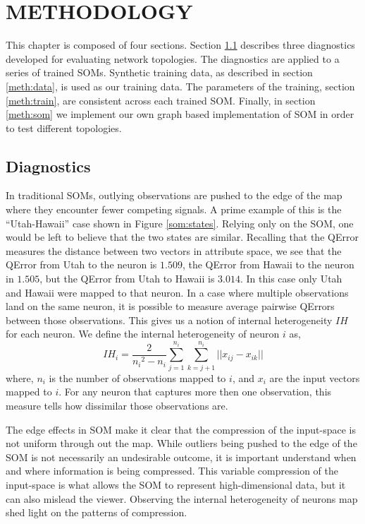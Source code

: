 \chapter{METHODOLOGY}
This chapter is composed of four sections.  Section \ref{meth:diag} describes
three diagnostics developed for evaluating network topologies.  The
diagnostics are applied to a series of trained SOMs.  Synthetic training data,
as described in section \ref{meth:data}, is used as our training data.  The
parameters of the training, section \ref{meth:train}, are consistent across
each trained SOM. Finally, in section \ref{meth:som} we implement our own
graph based implementation of SOM in order to test different topologies.

\section{Diagnostics}
\label{meth:diag}

In traditional SOMs, outlying observations are pushed to the edge of the map
where they encounter fewer competing signals.  A prime example of this is the
``Utah-Hawaii'' case shown in Figure \ref{som:states}.  Relying only on the
SOM, one would be left to believe that the two states are similar.  Recalling
that the QError measures the distance between two vectors in attribute space,
we see that the QError from Utah to the neuron is $1.509$, the QError from
Hawaii to the neuron in $1.505$, but the QError from Utah to Hawaii is
$3.014$. In this case only Utah and Hawaii were mapped to that neuron.  In a
case where multiple observations land on the same neuron, it is possible to
measure average pairwise QErrors between those observations.  This gives us a
notion of internal heterogeneity \(IH\) for each neuron.  We define the
internal heterogeneity of neuron \(i\) as,
 \begin{equation}
   {IH_i} = \frac{2}{{n_i}^2-{n_i}}\sum_{j=1}^{n_i}\sum_{k=j+1}^{n_i} ||{x_{ij}}-{x_{ik}}||
 \label{eqno1}
 \end{equation}
where, \(n_i\) is the number of observations mapped to \(i\), and \(x_i\) are
the input vectors mapped to \(i\).  For any neuron that captures more then one
observation, this measure tells how dissimilar those observations are.

The edge effects in SOM make it clear that the compression of the input-space is
not uniform through out the map.  While outliers being pushed to the edge of
the SOM is not necessarily an undesirable outcome, it is important understand
when and where information is being compressed.  This variable compression of
the input-space is what allows the SOM to represent high-dimensional data, but
it can also mislead the viewer.  Observing the internal heterogeneity of
neurons map shed light on the patterns of compression.

